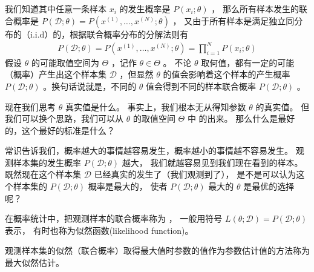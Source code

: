 \documentclass[letterpaper,10pt,english]{sphinxmanual}
\begin{document}
我们知道其中任意一条样本 \(x_i\) 的发生概率是 \(P(x_i;\theta)\) ，
那么所有样本发生的联合概率是 \(P(\mathcal{D};\theta)=P(x^{(1)},\ldots,x^{(N)};\theta)\) ，
又由于所有样本是满足独立同分布的（i.i.d）的，根据联合概率分布的分解法则有
\begin{equation}\label{equation:最大似然估计/content:最大似然估计/content:0}
\begin{split}P(\mathcal{D};\theta) = P(x^{(1)},\ldots,x^{(N)};\theta)
=\prod_{i=1}^{N} P(x_i;\theta)\end{split}
\end{equation}
假设 \(\theta\) 的可能取值空间为
\(\Theta\) ，记作 \(\theta \in \Theta\) 。
不论 \(\theta\) 取何值，都有一定的可能（概率）产生出这个样本集 \(\mathcal{D}\)
，但显然 \(\theta\) 的值会影响着这个样本的产生概率 \(P(\mathcal{D};\theta)\)
。换句话说就是，不同的 \(\theta\) 值会得到不同的样本联合概率 \(P(\mathcal{D};\theta)\) 。

现在我们思考 \(\theta\) 真实值是什么。
事实上，我们根本无从得知参数 \(\theta\) 的真实值。
但我们可以换个思路，我们可以从 \(\theta\) 的取值空间 \(\Theta\)
中  的出来。
那么什么是最好的，这个最好的标准是什么？

\begin{sphinxShadowBox}

常识告诉我们，概率越大的事情越容易发生，概率越小的事情越不容易发生。
观测样本集的发生概率 \(P(\mathcal{D};\theta)\) 越大，
我们就越容易见到我们现在看到的样本。
既然现在这个样本集 \(\mathcal{D}\) 已经真实的发生了（我们观测到了），
是不是可以认为这个样本集的 \(P(\mathcal{D};\theta)\) 概率是最大的，
使者 \(P(\mathcal{D};\theta)\) 最大的 \(\theta\) 是最优的选择呢？
\end{sphinxShadowBox}

在概率统计中，把观测样本的联合概率称为 ，
一般用符号 \(L(\theta;\mathcal{D})=P(\mathcal{D};\theta)\) 表示，
有时也称为似然函数(likelihood function)。

\begin{sphinxShadowBox}

观测样本集的似然（联合概率）取得最大值时参数的值作为参数估计值的方法称为最大似然估计。
\end{sphinxShadowBox}
\end{document}
